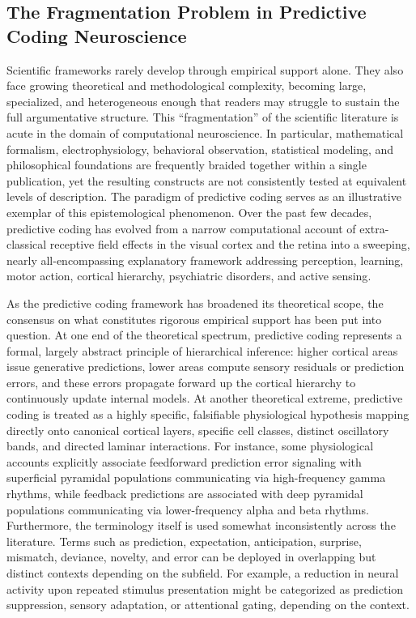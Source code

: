 \documentclass[12pt]{article}
\begin{document}
\subsection{The Fragmentation Problem in Predictive Coding Neuroscience}\label{the-fragmentation-problem-in-predictive-coding-neuroscience}

Scientific frameworks rarely develop through empirical support alone\cite{ref1}. They also face growing theoretical and methodological complexity, becoming large, specialized, and heterogeneous enough that readers may struggle to sustain the full argumentative structure\cite{ref2,ref3,ref4,ref5}. This ``fragmentation'' of the scientific literature is acute in the domain of computational neuroscience. In particular, mathematical formalism, electrophysiology, behavioral observation, statistical modeling, and philosophical foundations are frequently braided together within a single publication, yet the resulting constructs are not consistently tested at equivalent levels of description. The paradigm of predictive coding serves as an illustrative exemplar of this epistemological phenomenon. Over the past few decades, predictive coding has evolved from a narrow computational account of extra-classical receptive field effects in the visual cortex\cite{ref6} and the retina\cite{ref7} into a sweeping, nearly all-encompassing explanatory framework addressing perception\cite{ref8,ref9}, learning\cite{ref10}, motor action\cite{ref11,ref12}, cortical hierarchy\cite{ref13,ref14}, psychiatric disorders\cite{ref15,ref16}, and active sensing\cite{ref11,ref17}.

As the predictive coding framework has broadened its theoretical scope, the consensus on what constitutes rigorous empirical support has been put into question\cite{ref18,ref19}. At one end of the theoretical spectrum, predictive coding represents a formal, largely abstract principle of hierarchical inference: higher cortical areas issue generative predictions, lower areas compute sensory residuals or prediction errors, and these errors propagate forward up the cortical hierarchy to continuously update internal models\cite{ref20,ref21}. At another theoretical extreme, predictive coding is treated as a highly specific, falsifiable physiological hypothesis mapping directly onto canonical cortical layers, specific cell classes, distinct oscillatory bands, and directed laminar interactions\cite{ref14,ref22,ref23}. For instance, some physiological accounts explicitly associate feedforward prediction error signaling with superficial pyramidal populations communicating via high-frequency gamma rhythms\cite{ref24}, while feedback predictions are associated with deep pyramidal populations communicating via lower-frequency alpha and beta rhythms\cite{ref25,ref26}. Furthermore, the terminology itself is used somewhat inconsistently across the literature. Terms such as prediction, expectation, anticipation, surprise, mismatch, deviance, novelty, and error can be deployed in overlapping but distinct contexts depending on the subfield. For example, a reduction in neural activity upon repeated stimulus presentation might be categorized as prediction suppression, sensory adaptation, or attentional gating, depending on the context.
\end{document}
